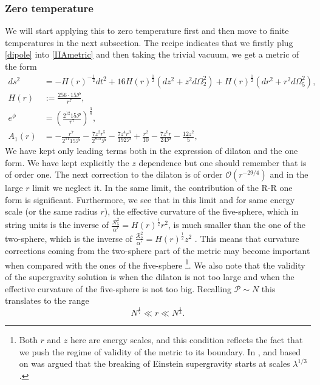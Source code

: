 \documentclass[11pt,english]{article}
\newcommand{\be}{\begin{equation}}
\newcommand{\ee}{\end{equation}}
\numberwithin{equation}{section}
\begin{document}
\subsubsection{Zero temperature}
We will start applying this to zero temperature first and then move to finite temperatures in the next subsection. The recipe indicates that we firstly plug \eqref{dipole} into \eqref{IIAmetric} and then taking the trivial vacuum, we get a metric of the form 
\begin{align} \label{trivialvac}
ds^2&= -H(r)^{-\frac{1}{2}}dt^2+16H(r)^{\frac{1}{2}}\left(dz^2+z^2d\Omega_2^2\right)+H(r)^{\frac{1}{2}}\left(dr^2+r^2d\Omega_5^2\right),
\\ H(r)&:= \frac{256\cdot 15\mathcal{P}}{r^7},\\
e^\phi&=\left(\frac{2^{12}15\mathcal{P}}{r^7}\right)^\frac{3}{4},%
\\
\label{oneform}A_1(r)&=-\frac{r^7}{2^{11}15\mathcal{P}}-\frac{7z^2r^5}{2^815\mathcal{P}}-\frac{7z^4r^3}{192\mathcal{P}}+\frac{r^2}{10}-\frac{7z^6r}{24\mathcal{P}}-\frac{12z^2}{5},
\end{align}
\noindent
We have kept only leading terms both in the expression of dilaton and the one form. We have kept explicitly the $z$ dependence but one should remember that is of order one. The next correction to the dilaton is of order $\mathcal{O}(r^{-29/4})$ and in the large $r$ limit we neglect it. In the same limit, the contribution of the R-R one form is significant. Furthermore, we see that in this limit and for same energy scale (or the same radius $r$), the effective curvature of the five-sphere, which in string units is the inverse of $\frac{\mathcal{R}_5^2}{\alpha'}=H(r)^{\frac{1}{2}}r^2$, is much smaller than the one of the two-sphere, which is the inverse of $\frac{\mathcal{R}_2^2}{\alpha'}=H(r)^{\frac{1}{2}}z^2$ . This means that curvature corrections coming from the two-sphere part of the metric may become important when compared with the ones of the five-sphere \cite{Lin2006} \footnote{Both $r$ and $z$ here are energy scales, and this condition reflects the fact that we push the regime of validity of the metric to its boundary. In \cite{Maldacena2018}, and based on \cite{Polchinski1999} was argued that the breaking of Einstein supergravity starts at scales $\lambda^{1/3}$.}.   We also note that the validity of the supergravity solution is when the dilaton is not too large and when the effective curvature of the five-sphere is not too big. Recalling $\mathcal{P}\sim N$ this translates to the range
\be \label{validsugra}
N^\frac{1}{7}\ll r\ll N^\frac{1}{3}.
\ee
 
\end{document}
